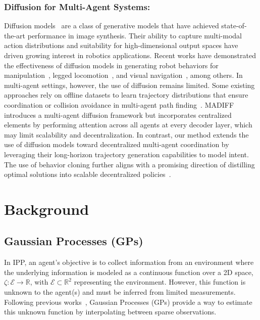 \documentclass[runningheads]{llncs}
\begin{document}
\subsubsection{Diffusion for Multi-Agent Systems:}
Diffusion models~\cite{ho2020denoisingdiffusionprobabilisticmodels,sohl2015deep} are a class of generative models that have achieved state-of-the-art performance in image synthesis. Their ability to capture multi-modal action distributions and suitability for high-dimensional output spaces have driven growing interest in robotics applications. Recent works have demonstrated the effectiveness of diffusion models in generating robot behaviors for manipulation~\cite{chi2024diffusionpolicy}, legged locomotion~\cite{huang2024diffuselocorealtimeleggedlocomotion}, and visual navigation~\cite{shah2023vint,Nomad}, among others. In multi-agent settings, however, the use of diffusion remains limited. Some existing approaches rely on offline datasets to learn trajectory distributions that ensure coordination or collision avoidance in multi-agent path finding~\cite{shaoul2024multi}. MADIFF~\cite{zhu2023madiff} introduces a multi-agent diffusion framework but incorporates centralized elements by performing attention across all agents at every decoder layer, which may limit scalability and decentralization. In contrast, our method extends the use of diffusion models toward decentralized multi-agent coordination by leveraging their long-horizon trajectory generation capabilities to model intent. The use of behavior cloning further aligns with a promising direction of distilling optimal solutions into scalable decentralized policies~\cite{Prorok2022aamas}.

\section{Background}
\subsection{Gaussian Processes (GPs)}  
\label{sec: gp}
In IPP, an agent's objective is to collect information from an environment where the underlying information is modeled as a continuous function over a 2D space, $\zeta: \mathcal{E} \rightarrow \mathbb{R}$, with $\mathcal{E} \subset \mathbb{R}^2$ representing the environment. However, this function is unknown to the agent(s) and must be inferred from limited measurements. Following previous works~\cite{cao2023catnipp,hitz_adaptive_2017,popovic_informative_2020,yang2023intentmaipp}, Gaussian Processes (GPs) provide a way to estimate this unknown function by interpolating between sparse observations.  
\end{document}
